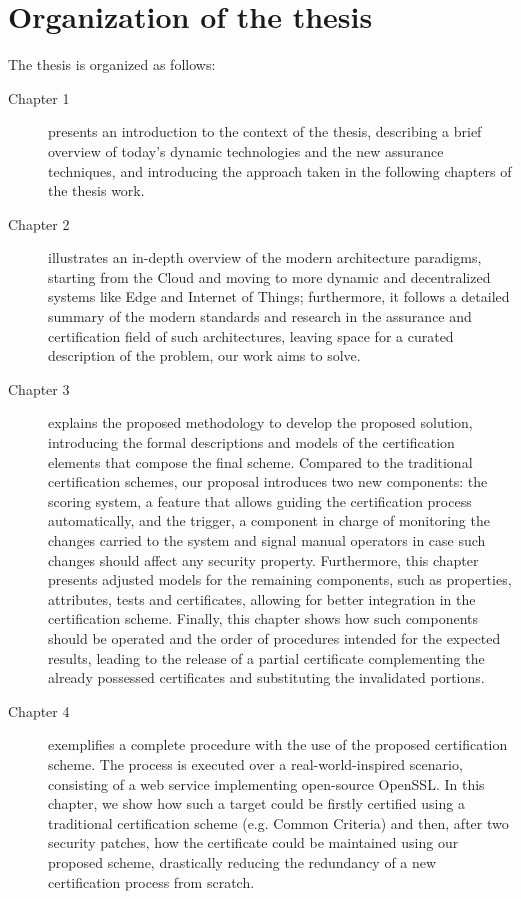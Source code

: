 \documentclass[hidelinks, a4paper, 12pt]{report}
\theoremstyle{definition}
\begin{document}
\section*{Organization of the thesis}
\label{organizzazione}
The thesis is organized as follows:
\begin{description}
    \item[Chapter 1] presents an introduction to the context of the thesis, describing a brief overview of today's dynamic technologies and the new assurance techniques, and introducing the approach taken in the following chapters of the thesis work.

    \item[Chapter 2] illustrates an in-depth overview of the modern architecture paradigms, starting from the Cloud and moving to more dynamic and decentralized systems like Edge and Internet of Things; furthermore, it follows a detailed summary of the modern standards and research in the assurance and certification field of such architectures, leaving space for a curated description of the problem, our work aims to solve.

    \item[Chapter 3] explains the proposed methodology to develop the proposed solution, introducing the formal descriptions and models of the certification elements that compose the final scheme. Compared to the traditional certification schemes, our proposal introduces two new components: the scoring system, a feature that allows guiding the certification process automatically, and the trigger, a component in charge of monitoring the changes carried to the system and signal manual operators in case such changes should affect any security property. Furthermore, this chapter presents adjusted models for the remaining components, such as properties, attributes, tests and certificates, allowing for better integration in the certification scheme. Finally, this chapter shows how such components should be operated and the order of procedures intended for the expected results, leading to the release of a partial certificate complementing the already possessed certificates and substituting the invalidated portions.

    \item[Chapter 4] exemplifies a complete procedure with the use of the proposed certification scheme. The process is executed over a real-world-inspired scenario, consisting of a web service implementing open-source OpenSSL. In this chapter, we show how such a target could be firstly certified using a traditional certification scheme (e.g. Common Criteria) and then, after two security patches, how the certificate could be maintained using our proposed scheme, drastically reducing the redundancy of a new certification process from scratch.


\end{description}
\end{document}
